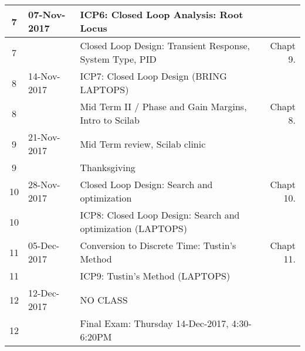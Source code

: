 \begin{tabular}{|c|l|l|r|}
7 &                                                               07-Nov-2017
&  ICP6: Closed Loop Analysis:  Root Locus &  \\ \hline 
7 &                                                               
&  Closed Loop Design: Transient Response, System Type, PID      &  Chapt 9. \\ \hline 


8 &                                                               14-Nov-2017
&  ICP7: Closed Loop Design (BRING LAPTOPS) &  \\ \hline 
8 &                                                               
&  Mid Term II  / Phase and Gain Margins, Intro to Scilab                   &  Chapt 8. \\ \hline 


9 &                                                               21-Nov-2017
&  Mid Term review, Scilab clinic &  \\ \hline 
9 &                                                               
&    Thanksgiving  &  \\ \hline 


10 &                                                               28-Nov-2017
&  Closed Loop Design: Search and optimization 			 &  Chapt 10. \\ \hline 
10 &                                                               
&  ICP8: Closed Loop Design: Search and optimization (LAPTOPS) &  \\ \hline 


11 &                                                               05-Dec-2017
&  Conversion to Discrete Time: Tustin's Method                             & Chapt 11.  \\ \hline 
11 &                                                               
&  ICP9: Tustin's Method (LAPTOPS)  &  \\ \hline 


12 &                                                               12-Dec-2017
&  NO CLASS &  \\ \hline 
12 &                                                               
&  Final Exam: Thursday 14-Dec-2017, 4:30-6:20PM &  \\ \hline 



\end{tabular}
